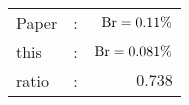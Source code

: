       \begin{tabular}{lcr}
          Paper &:& $\mathrm{Br}  = 0.11\%$ \\
          this      &:& $\mathrm{Br}  = 0.081\%$ \\
		  ratio   &:& $0.738$ \\
      \end{tabular}
